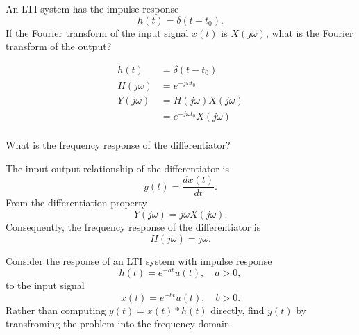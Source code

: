 \begin{frame}[plain]
    \begin{example}
        An LTI system has the impulse response
        \begin{equation*}
            h(t) = \delta(t-t_0).
        \end{equation*}
        If the Fourier transform of the input signal $x(t)$ is $X(j\omega)$, what is the Fourier transform of the output?
    \end{example}
    \pause
    \begin{align*}
      h(t) &= \delta(t-t_0)\\
      H(j\omega) &= e^{-j\omega t_0}\\
      Y(j\omega) &=  H(j\omega)  X(j\omega)\\
      &= e^{-j\omega t_0} X(j\omega)\\
    \end{align*}
\end{frame}

\begin{frame}
    \begin{example}
        What is the frequency response of the differentiator?
    \end{example}
    \pause
    The input output relationship of the differentiator is
    \begin{equation*}
        y(t) = \frac{dx(t)}{dt}.
    \end{equation*}
    From the differentiation property
    \pause
    \begin{equation*}
        Y(j\omega) = j\omega X(j\omega).
    \end{equation*}
    \pause
    Consequently, the frequency response of the differentiator is 
    \begin{equation*}
        H(j\omega) = j\omega.
    \end{equation*}
\end{frame}


\begin{frame}
    \begin{example}
        Consider the response of an LTI system with impulse response 
        \begin{equation*}
            h(t) = e^{-at}u(t), \quad a>0,
        \end{equation*}
        to the input signal 
        \begin{equation*}
            x(t) = e^{-bt}u(t), \quad b>0.
        \end{equation*}   
        Rather than computing $y(t) = x(t) \ast h(t)$ directly, find $y(t)$ by transfroming the problem into the frequency domain.     
    \end{example}
\end{frame}

